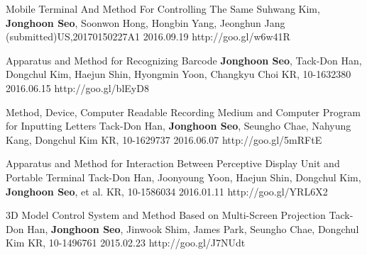 
\begin{cventries}
  \cvpatententry
    {Mobile Terminal And Method For Controlling The Same} %
    {Suhwang Kim, \textbf{Jonghoon Seo}, Soonwon Hong, Hongbin Yang, Jeonghun Jang} %
    {(submitted)US,20170150227A1} %
    {2016.09.19} %
    {http://goo.gl/w6w41R}

  \cvpatententry
    {Apparatus and Method for Recognizing Barcode} %
    {\textbf{Jonghoon Seo}, Tack-Don Han, Dongchul Kim, Haejun Shin, Hyongmin Yoon, Changkyu Choi} %
    {KR, 10-1632380} %
    {2016.06.15} %
    {http://goo.gl/blEyD8}

  \cvpatententry
    {Method, Device, Computer Readable Recording Medium and Computer Program for Inputting Letters} %
    {Tack-Don Han, \textbf{Jonghoon Seo}, Seungho Chae, Nahyung Kang, Dongchul Kim} %
    {KR, 10-1629737} %
    {2016.06.07} %
    {http://goo.gl/5mRFtE}

  \cvpatententry
    {Apparatus and Method for Interaction Between Perceptive Display Unit and Portable Terminal} %
    {Tack-Don Han, Joonyoung Yoon, Haejun Shin, Dongchul Kim, \textbf{Jonghoon Seo}, et al.} %
    {KR, 10-1586034} %
    {2016.01.11} %
    {http://goo.gl/YRL6X2}

  \cvpatententry
    {3D Model Control System and Method Based on Multi-Screen Projection} %
    {Tack-Don Han, \textbf{Jonghoon Seo}, Jinwook Shim, James Park, Seungho Chae, Dongchul Kim} %
    {KR, 10-1496761} %
    {2015.02.23} %
    {http://goo.gl/J7NUdt}


\end{cventries}
